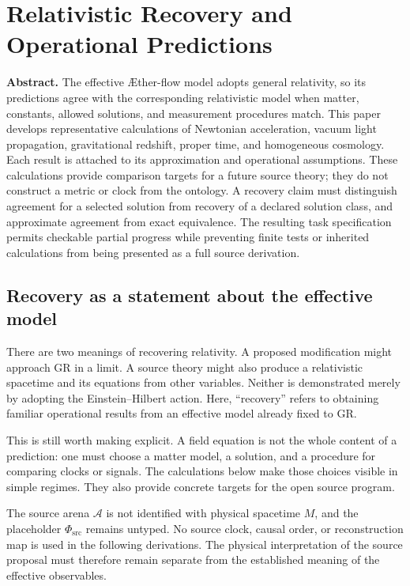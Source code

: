 \documentclass[11pt,oneside]{report}
\newcommand{\Aflow}{\AE{}ther-flow}
\newcommand{\Sub}{\mathcal A}
\newcommand{\PhiSrc}{\Phi_{\mathrm{src}}}
\theoremstyle{remark}
\numberwithin{definition}{chapter}
\numberwithin{proposition}{chapter}
\numberwithin{remark}{chapter}
\newcommand{\ChapterAbstract}[1]{%
  \begingroup
  \setlength{\parindent}{0pt}%
  \small\textbf{Abstract.} #1\par
  \endgroup
  \vspace{0.55\baselineskip}%
}
\begin{document}
\chapter{Relativistic Recovery and Operational Predictions}
\label{chapter:relativistic_recovery}
\ChapterAbstract{The effective \Aflow{} model adopts general relativity, so its predictions agree with the corresponding relativistic model when matter, constants, allowed solutions, and measurement procedures match. This paper develops representative calculations of Newtonian acceleration, vacuum light propagation, gravitational redshift, proper time, and homogeneous cosmology. Each result is attached to its approximation and operational assumptions. These calculations provide comparison targets for a future source theory; they do not construct a metric or clock from the ontology. A recovery claim must distinguish agreement for a selected solution from recovery of a declared solution class, and approximate agreement from exact equivalence. The resulting task specification permits checkable partial progress while preventing finite tests or inherited calculations from being presented as a full source derivation.}

\section{Recovery as a statement about the effective model}
There are two meanings of recovering relativity. A proposed modification might approach GR in a limit. A source theory might also produce a relativistic spacetime and its equations from other variables. Neither is demonstrated merely by adopting the Einstein--Hilbert action. Here, ``recovery'' refers to obtaining familiar operational results from an effective model already fixed to GR.

This is still worth making explicit. A field equation is not the whole content of a prediction: one must choose a matter model, a solution, and a procedure for comparing clocks or signals. The calculations below make those choices visible in simple regimes. They also provide concrete targets for the open source program.

The source arena $\Sub$ is not identified with physical spacetime $M$, and the placeholder $\PhiSrc$ remains untyped. No source clock, causal order, or reconstruction map is used in the following derivations. The physical interpretation of the source proposal must therefore remain separate from the established meaning of the effective observables.
\end{document}
